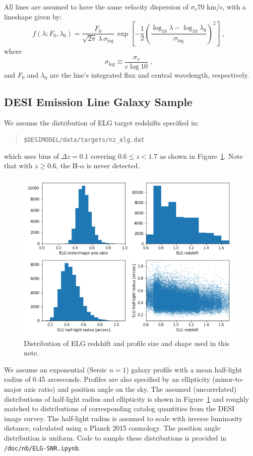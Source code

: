\documentclass[12pt]{article}
\providecommand{\fig}[1]{Figure~\ref{fig:#1}}
\begin{document}
All lines are assumed to have the same velocity dispersion of $\sigma_v 70$ km/s, with a lineshape given by:
$$
f(\lambda; F_0, \lambda_0) = \frac{F_0}{\sqrt{2\pi}\,\lambda\,\sigma_{\log}}\, \exp\left[
-\frac{1}{2}\left( \frac{\log_{10}\lambda - \log_{10}\lambda_0}{\sigma_{\log}}\right)^2\right]\; ,
$$
where
$$
\sigma_{\log} \equiv \frac{\sigma_v}{c \log 10} \; ,
$$
and $F_0$ and $\lambda_0$ are the line's integrated flux and central wavelength, respectively.

\subsection{DESI Emission Line Galaxy Sample}

We assume the distribution of ELG target redshifts specified in:
\begin{quote}
{\tt \$DESIMODEL/data/targets/nz\_elg.dat}
\end{quote}  
which uses bins of $\Delta z = 0.1$ covering $0.6 \le z < 1.7$ as shown in \fig{elg-sample}.
Note that with $z \ge 0.6$, the H-$\alpha$ is never detected. 

\begin{figure}[htb]
\begin{center}
\includegraphics[width=6in]{elg-sample}
\caption{Distribution of ELG redshift and profile size and shape used in this note.}
\label{fig:elg-sample}
\end{center}
\end{figure}

We assume an exponential (Sersic $n=1$) galaxy profile with a mean half-light radius of 0.45 arcseconds. Profiles are also specified
by an ellipticity (minor-to-major axis ratio) and position angle on the sky. The assumed (uncorrelated) distributions of half-light radius and ellipticity
is shown in \fig{elg-sample} and roughly matched to distributions of corresponding catalog quantities from the DESI image survey.
The half-light radius is assumed to scale with inverse luminosity distance, calculated using a Planck 2015 cosmology. The position angle
distribution is uniform. Code to sample these distributions is provided in {\tt /doc/nb/ELG-SNR.ipynb}.
\end{document}
